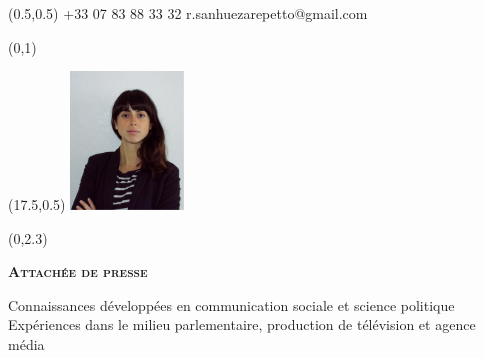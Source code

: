 \documentclass[30pt, french]{tccv}
\begin{document}
\begin{upshape}
\fontsize{9pt}{1em}\color{text}\selectfont



%
%




\begin{textblock}{6.5}(0.5,0.5)
    {+33 07 83 88 33 32}
    {r.sanhuezarepetto@gmail.com}
\end{textblock}

\begin{textblock}{21}(0,1)
\end{textblock}

\begin{textblock}{21}(17.5,0.5)
		\includegraphics[width=3cm]{../Figure/Rocio3.png}
\end{textblock}  



\begin{textblock}{21}(0,2.3)

\begin{center}
\fontsize{10pt}{1.5em}\color{text}\bodyfontlight\upshape\selectfont

	{\fontsize{14pt}{5em}\scshape\bfseries Attachée de presse  \\} 

	\vspace{5pt}
Connaissances développées en communication sociale et science politique 			\\
Expériences dans le milieu parlementaire, production de télévision et agence média		 	\\

\end{center}
\end{textblock}  






\end{upshape}
\end{document}
